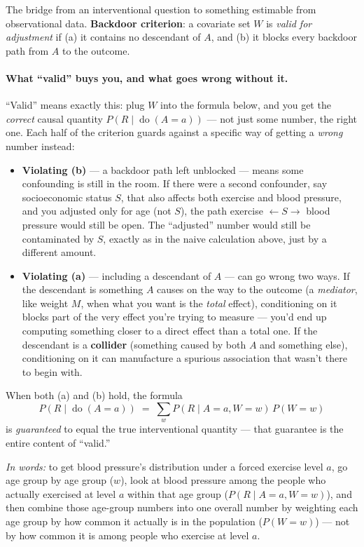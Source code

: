 The bridge from an interventional question to something estimable from
observational data. \textbf{Backdoor criterion}: a covariate set $W$ is
\emph{valid for adjustment} if (a) it contains no descendant of $A$, and
(b) it blocks every backdoor path from $A$ to the outcome.

\paragraph{What ``valid'' buys you, and what goes wrong without it.}
``Valid'' means exactly this: plug $W$ into the formula below, and you get
the \emph{correct} causal quantity $P(R\mid\operatorname{do}(A=a))$ ---
not just some number, the right one. Each half of the criterion guards
against a specific way of getting a \emph{wrong} number instead:
\begin{itemize}
  \item \textbf{Violating (b)} --- a backdoor path left unblocked --- means
    some confounding is still in the room. If there were a second
    confounder, say socioeconomic status $S$, that also affects both
    exercise and blood pressure, and you adjusted only for age (not $S$),
    the path exercise $\leftarrow S \to$ blood pressure would still be
    open. The ``adjusted'' number would still be contaminated by $S$,
    exactly as in the naive calculation above, just by a different amount.
  \item \textbf{Violating (a)} --- including a descendant of $A$ --- can go
    wrong two ways. If the descendant is something $A$ causes on the way
    to the outcome (a \emph{mediator}, like weight $M$, when what you want
    is the \emph{total} effect), conditioning on it blocks part of the very
    effect you're trying to measure --- you'd end up computing something
    closer to a direct effect than a total one. If the descendant is a
    \textbf{collider} (something caused by both $A$ and something else),
    conditioning on it can manufacture a spurious association that wasn't
    there to begin with.
\end{itemize}
When both (a) and (b) hold, the formula
\begin{equation}
  P(R \mid \operatorname{do}(A=a)) \;=\; \sum_w P(R \mid A=a, W=w)\, P(W=w)
  \label{eq:backdoor}
\end{equation}
is \emph{guaranteed} to equal the true interventional quantity --- that
guarantee is the entire content of ``valid.''

\emph{In words:} to get blood pressure's distribution under a forced
exercise level $a$, go age group by age group ($w$), look at blood pressure
among the people who actually exercised at level $a$ within that age group
($P(R\mid A=a,W=w)$), and then combine those age-group numbers into one
overall number by weighting each age group by how common it actually is in
the population ($P(W=w)$) --- not by how common it is among people who
exercise at level $a$.

